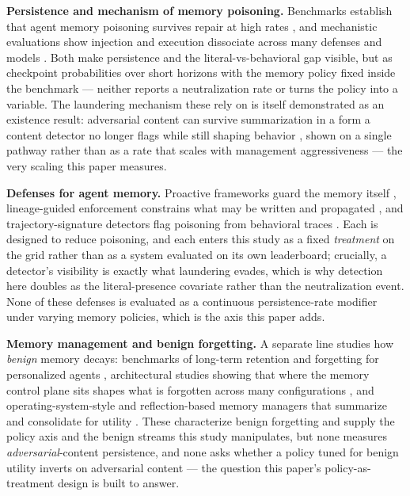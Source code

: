 \documentclass[11pt]{article}
\begin{document}
\textbf{Persistence and mechanism of memory poisoning.} Benchmarks establish that agent memory poisoning survives repair at high rates \citep{chen2026memsecbench}, and mechanistic evaluations show injection and execution dissociate across many defenses and models \citep{leong2026injexec}. Both make persistence and the literal-vs-behavioral gap visible, but as checkpoint probabilities over short horizons with the memory policy fixed inside the benchmark --- neither reports a neutralization rate or turns the policy into a variable. The laundering mechanism these rely on is itself demonstrated as an existence result: adversarial content can survive summarization in a form a content detector no longer flags while still shaping behavior \citep{wang2026statecontam}, shown on a single pathway rather than as a rate that scales with management aggressiveness --- the very scaling this paper measures.

\textbf{Defenses for agent memory.} Proactive frameworks guard the memory itself \citep{wei2025amemguard}, lineage-guided enforcement constrains what may be written and propagated \citep{ouyang2026memlineage}, and trajectory-signature detectors flag poisoning from behavioral traces \citep{leong2026forensic}. Each is designed to reduce poisoning, and each enters this study as a fixed \emph{treatment} on the grid rather than as a system evaluated on its own leaderboard; crucially, a detector's visibility is exactly what laundering evades, which is why detection here doubles as the literal-presence covariate rather than the neutralization event. None of these defenses is evaluated as a continuous persistence-rate modifier under varying memory policies, which is the axis this paper adds.

\textbf{Memory management and benign forgetting.} A separate line studies how \emph{benign} memory decays: benchmarks of long-term retention and forgetting for personalized agents \citep{uddin2026recall}, architectural studies showing that where the memory control plane sits shapes what is forgotten across many configurations \citep{yang2026controlplane}, and operating-system-style and reflection-based memory managers that summarize and consolidate for utility \citep{packer2023memgpt,park2023generative}. These characterize benign forgetting and supply the policy axis and the benign streams this study manipulates, but none measures \emph{adversarial}-content persistence, and none asks whether a policy tuned for benign utility inverts on adversarial content --- the question this paper's policy-as-treatment design is built to answer.
\end{document}

